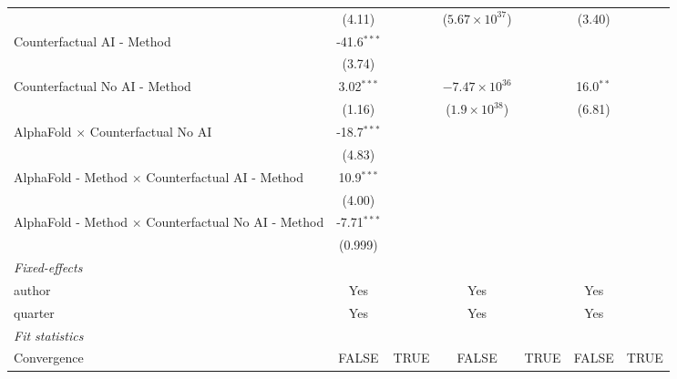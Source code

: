 \begin{tabular}{lcccccc}
                                                              & (4.11)        &      & ($5.67\times 10^{37}$)  &      & (3.40)       &   \\   
   Counterfactual AI - Method                                 & -41.6$^{***}$ &      &                         &      &              &   \\   
                                                              & (3.74)        &      &                         &      &              &   \\   
   Counterfactual No AI - Method                              & 3.02$^{***}$  &      & $-7.47\times 10^{36}$   &      & 16.0$^{**}$  &   \\   
                                                              & (1.16)        &      & ($1.9\times 10^{38}$)   &      & (6.81)       &   \\   
   AlphaFold $\times$ Counterfactual No AI                    & -18.7$^{***}$ &      &                         &      &              &   \\   
                                                              & (4.83)        &      &                         &      &              &   \\   
   AlphaFold - Method $\times$ Counterfactual AI - Method     & 10.9$^{***}$  &      &                         &      &              &   \\   
                                                              & (4.00)        &      &                         &      &              &   \\   
   AlphaFold - Method $\times$ Counterfactual No AI - Method  & -7.71$^{***}$ &      &                         &      &              &   \\   
                                                              & (0.999)       &      &                         &      &              &   \\   
   \midrule
   \emph{Fixed-effects}\\
   author                                                     & Yes           &      & Yes                     &      & Yes          & \\  
   quarter                                                    & Yes           &      & Yes                     &      & Yes          & \\  
   \midrule
   \emph{Fit statistics}\\
   Convergence                                                &FALSE          & TRUE & FALSE                   & TRUE & FALSE        & TRUE\\  

\end{tabular}
